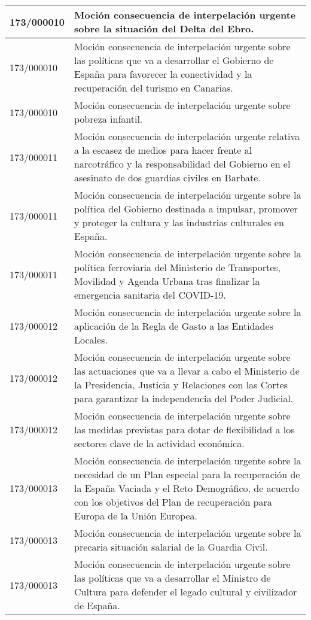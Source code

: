 {\begin{table}[H]
\begin{center}
\begin{tabularx}{\linewidth}{| l | X |}
\hline
173/000010 & Moción consecuencia de interpelación urgente sobre la situación del Delta del Ebro. \\
\hline
173/000010 & Moción consecuencia de interpelación urgente sobre las políticas que va a desarrollar el Gobierno de España para favorecer la conectividad y la recuperación del turismo en Canarias. \\
\hline
173/000010 & Moción consecuencia de interpelación urgente sobre pobreza infantil. \\
\hline
173/000011 & Moción consecuencia de interpelación urgente relativa a la escasez de medios para hacer frente al narcotráfico y la responsabilidad del Gobierno en el asesinato de dos guardias civiles en Barbate. \\
\hline
173/000011 & Moción consecuencia de interpelación urgente sobre la política del Gobierno destinada a impulsar, promover y proteger la cultura y las industrias culturales en España. \\
\hline
173/000011 & Moción consecuencia de interpelación urgente sobre la política ferroviaria del Ministerio de Transportes, Movilidad y Agenda Urbana tras finalizar la emergencia sanitaria del COVID-19. \\
\hline
173/000012 & Moción consecuencia de interpelación urgente sobre la aplicación de la Regla de Gasto a las Entidades Locales. \\
\hline
173/000012 & Moción consecuencia de interpelación urgente sobre las actuaciones que va a llevar a cabo el Ministerio de la Presidencia, Justicia y Relaciones con las Cortes para garantizar la independencia del Poder Judicial. \\
\hline
173/000012 & Moción consecuencia de interpelación urgente sobre las medidas previstas para dotar de flexibilidad a los sectores clave de la actividad económica. \\
\hline
173/000013 & Moción consecuencia de interpelación urgente sobre la necesidad de un Plan especial para la recuperación de la España Vaciada y el Reto Demográfico, de acuerdo con los objetivos del Plan de recuperación para Europa de la Unión Europea. \\
\hline
173/000013 & Moción consecuencia de interpelación urgente sobre la precaria situación salarial de la Guardia Civil. \\
\hline
173/000013 & Moción consecuencia de interpelación urgente sobre las políticas que va a desarrollar el Ministro de Cultura para defender el legado cultural y civilizador de España. \\

\end{tabularx}
\end{center}
\end{table}}
